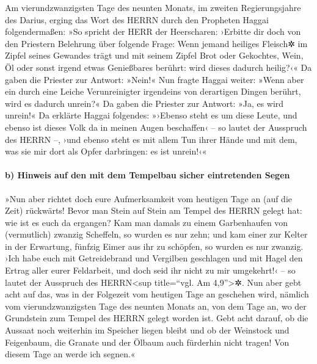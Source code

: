  Am vierundzwanzigsten Tage des neunten Monats, im
zweiten Regierungsjahre des Darius, erging das Wort des HERRN durch den
Propheten Haggai folgendermaßen:  »So spricht der HERR
der Heerscharen: ›Erbitte dir doch von den Priestern Belehrung über
folgende Frage:  Wenn jemand heiliges Fleisch✲ im Zipfel
seines Gewandes trägt und mit seinem Zipfel Brot oder Gekochtes, Wein,
Öl oder sonst irgend etwas Genießbares berührt: wird dieses dadurch
heilig?‹« Da gaben die Priester zur Antwort: »Nein!«  Nun
fragte Haggai weiter: »Wenn aber ein durch eine Leiche Verunreinigter
irgendeins von derartigen Dingen berührt, wird es dadurch unrein?« Da
gaben die Priester zur Antwort: »Ja, es wird unrein!«  Da
erklärte Haggai folgendes: »›Ebenso steht es um diese Leute, und ebenso
ist dieses Volk da in meinen Augen beschaffen‹ -- so lautet der
Ausspruch des HERRN --, ›und ebenso steht es mit allem Tun ihrer Hände
und mit dem, was sie mir dort als Opfer darbringen: es ist unrein!‹«

\hypertarget{b-hinweis-auf-den-mit-dem-tempelbau-sicher-eintretenden-segen}{%
\paragraph{b) Hinweis auf den mit dem Tempelbau sicher eintretenden
Segen}\label{b-hinweis-auf-den-mit-dem-tempelbau-sicher-eintretenden-segen}}

 »Nun aber richtet doch eure Aufmerksamkeit vom heutigen
Tage an (auf die Zeit) rückwärts! Bevor man Stein auf Stein am Tempel
des HERRN gelegt hat:  wie ist es euch da ergangen? Kam
man damals zu einem Garbenhaufen von (vermutlich) zwanzig Scheffeln, so
wurden es nur zehn; und kam einer zur Kelter in der Erwartung, fünfzig
Eimer aus ihr zu schöpfen, so wurden es nur zwanzig. 
›Ich habe euch mit Getreidebrand und Vergilben geschlagen und mit Hagel
den Ertrag aller eurer Feldarbeit, und doch seid ihr nicht zu mir
umgekehrt!‹ -- so lautet der Ausspruch des HERRN\textless sup
title=``vgl. Am 4,9''\textgreater✲.  Nun aber gebt acht
auf das, was in der Folgezeit vom heutigen Tage an geschehen wird,
nämlich vom vierundzwanzigsten Tage des neunten Monats an, von dem Tage
an, wo der Grundstein zum Tempel des HERRN gelegt worden ist. Gebt acht
darauf,  ob die Aussaat noch weiterhin im Speicher liegen
bleibt und ob der Weinstock und Feigenbaum, die Granate und der Ölbaum
auch fürderhin nicht tragen! Von diesem Tage an werde ich segnen.«

